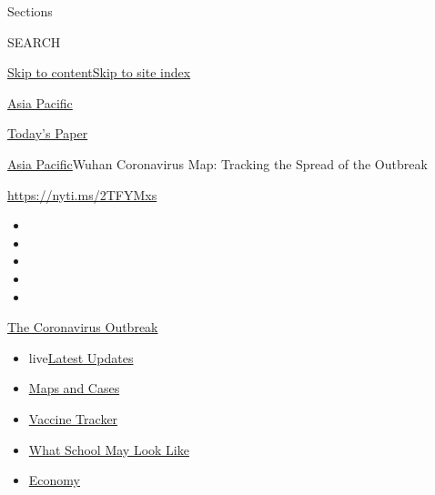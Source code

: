Sections

SEARCH

\protect\hyperlink{site-content}{Skip to
content}\protect\hyperlink{site-index}{Skip to site index}

\href{https://www.nytimes.com/section/world/asia}{Asia Pacific}

\href{https://myaccount.nytimes.com/auth/login?response_type=cookie\&client_id=vi}{}

\href{https://www.nytimes.com/section/todayspaper}{Today's Paper}

\href{/section/world/asia}{Asia Pacific}\textbar{}Wuhan Coronavirus Map:
Tracking the Spread of the Outbreak

\url{https://nyti.ms/2TFYMxs}

\begin{itemize}
\item
\item
\item
\item
\item
\end{itemize}

\href{https://www.nytimes.com/news-event/coronavirus?action=click\&pgtype=Article\&state=default\&region=TOP_BANNER\&context=storylines_menu}{The
Coronavirus Outbreak}

\begin{itemize}
\tightlist
\item
  live\href{https://www.nytimes.com/2020/08/02/world/coronavirus-updates.html?action=click\&pgtype=Article\&state=default\&region=TOP_BANNER\&context=storylines_menu}{Latest
  Updates}
\item
  \href{https://www.nytimes.com/interactive/2020/us/coronavirus-us-cases.html?action=click\&pgtype=Article\&state=default\&region=TOP_BANNER\&context=storylines_menu}{Maps
  and Cases}
\item
  \href{https://www.nytimes.com/interactive/2020/science/coronavirus-vaccine-tracker.html?action=click\&pgtype=Article\&state=default\&region=TOP_BANNER\&context=storylines_menu}{Vaccine
  Tracker}
\item
  \href{https://www.nytimes.com/interactive/2020/07/29/us/schools-reopening-coronavirus.html?action=click\&pgtype=Article\&state=default\&region=TOP_BANNER\&context=storylines_menu}{What
  School May Look Like}
\item
  \href{https://www.nytimes.com/live/2020/07/31/business/stock-market-today-coronavirus?action=click\&pgtype=Article\&state=default\&region=TOP_BANNER\&context=storylines_menu}{Economy}
\end{itemize}

